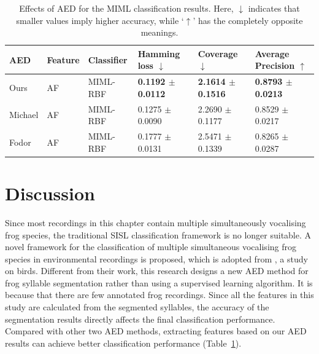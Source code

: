\begin{table}[htb!]
\centering
\caption[Effects of AED for the MIML classification results]{Effects of AED for the MIML classification results. Here, $\downarrow$ indicates that smaller values imply higher accuracy, while ‘$\uparrow$’ has the completely opposite meanings.}
\label{Ch6:AEDCompare}
\begin{tabular}{llllll}
\hline\hline
AED     & Feature & Classifier & Hamming loss $\downarrow$ & Coverage $\downarrow$     & Average Precision  $\uparrow$\\ \hline
Ours    & AF      & MIML-RBF   & \textbf{0.1192 $\pm$ 0.0112} & \textbf{2.1614 $\pm$ 0.1516} & \textbf{0.8793 $\pm$ 0.0213}     \\ 
Michael & AF      & MIML-RBF   & 0.1275 $\pm$ 0.0090 & 2.2690 $\pm$ 0.1177 & 0.8529 $\pm$ 0.0217     \\ 
Fodor   & AF      & MIML-RBF   & 0.1777 $\pm$ 0.0131 & 2.5471 $\pm$ 0.1339 & 0.8265 $\pm$ 0.0287     \\ \hline\hline
\end{tabular}
\end{table}




\section{Discussion}
Since most recordings in this chapter contain multiple simultaneously vocalising frog species, the traditional SISL classification framework is no longer suitable. A novel framework for the classification of multiple simultaneous vocalising frog species in environmental recordings is proposed, which is adopted from \citep{briggs2012acoustic}, a study on birds. Different from their work, this research designs a new AED method for frog syllable segmentation rather than using a supervised learning algorithm. It is because that there are few annotated frog recordings. Since all the features in this study are calculated from the segmented syllables, the accuracy of the segmentation results directly affects the final classification performance. Compared with other two AED methods, extracting features based on our AED results can achieve better classification performance (Table~\ref{Ch6:AEDCompare}).

